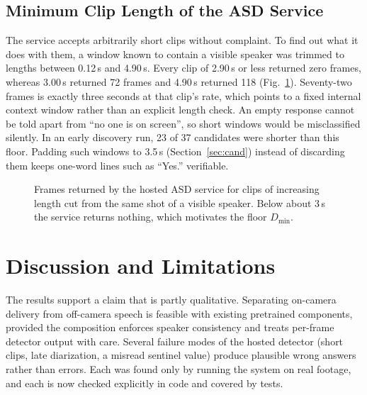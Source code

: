 \documentclass[conference]{IEEEtran}
\begin{document}
\subsection{Minimum Clip Length of the ASD Service}
\label{sec:probe}
The service accepts arbitrarily short clips without complaint. To find out what it does with them, a window known to contain a visible speaker was trimmed to lengths between 0.12\,s and 4.90\,s. Every clip of 2.90\,s or less returned zero frames, whereas 3.00\,s returned 72 frames and 4.90\,s returned 118 (Fig.~\ref{fig:probe}). Seventy-two frames is exactly three seconds at that clip's rate, which points to a fixed internal context window rather than an explicit length check. An empty response cannot be told apart from ``no one is on screen'', so short windows would be misclassified silently. In an early discovery run, 23 of 37 candidates were shorter than this floor. Padding such windows to 3.5\,s (Section~\ref{sec:cand}) instead of discarding them keeps one-word lines such as ``Yes.'' verifiable.

\begin{figure}[t]
\centering
{}
\caption{Frames returned by the hosted ASD service for clips of increasing length cut from the same shot of a visible speaker. Below about 3\,s the service returns nothing, which motivates the floor $D_{\min}$.}
\label{fig:probe}
\end{figure}

\section{Discussion and Limitations}
\label{sec:discussion}

The results support a claim that is partly qualitative. Separating on-camera delivery from off-camera speech is feasible with existing pretrained components, provided the composition enforces speaker consistency and treats per-frame detector output with care. Several failure modes of the hosted detector (short clips, late diarization, a misread sentinel value) produce plausible wrong answers rather than errors. Each was found only by running the system on real footage, and each is now checked explicitly in code and covered by tests.
\end{document}
